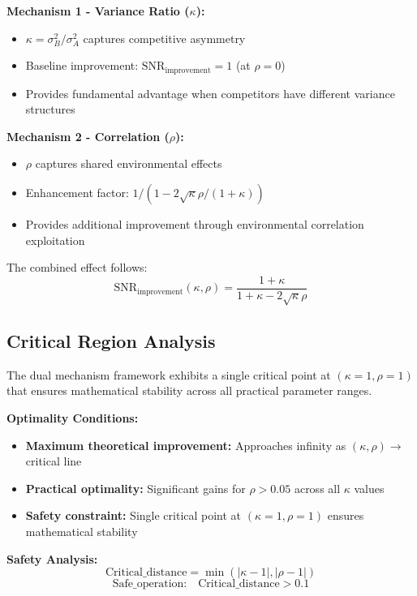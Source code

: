\textbf{Mechanism 1 - Variance Ratio ($\kappa$):}
\begin{itemize}
    \item $\kappa = \sigma_B^2/\sigma_A^2$ captures competitive asymmetry
    \item Baseline improvement: $\text{SNR}_{\text{improvement}} = 1$ (at $\rho = 0$)
    \item Provides fundamental advantage when competitors have different variance structures
\end{itemize}

\textbf{Mechanism 2 - Correlation ($\rho$):}
\begin{itemize}
    \item $\rho$ captures shared environmental effects
    \item Enhancement factor: $1/(1 - 2\sqrt{\kappa}\rho/(1+\kappa))$
    \item Provides additional improvement through environmental correlation exploitation
\end{itemize}

The combined effect follows:
\begin{equation}
\text{SNR}_{\text{improvement}}(\kappa, \rho) = \frac{1 + \kappa}{1 + \kappa - 2\sqrt{\kappa}\rho} \label{eq:dual_mechanism}
\end{equation}

\subsection{Critical Region Analysis}

The dual mechanism framework exhibits a single critical point at $(\kappa=1, \rho=1)$ that ensures mathematical stability across all practical parameter ranges.

\textbf{Optimality Conditions:}
\begin{itemize}
    \item \textbf{Maximum theoretical improvement:} Approaches infinity as $(\kappa,\rho) \rightarrow$ critical line
    \item \textbf{Practical optimality:} Significant gains for $\rho > 0.05$ across all $\kappa$ values
    \item \textbf{Safety constraint:} Single critical point at $(\kappa=1, \rho=1)$ ensures mathematical stability
\end{itemize}

\textbf{Safety Analysis:}
\begin{equation}
\text{Critical\_distance} = \min(|\kappa - 1|, |\rho - 1|)
\end{equation}
\begin{equation}
\text{Safe\_operation:} \quad \text{Critical\_distance} > 0.1
\end{equation}

